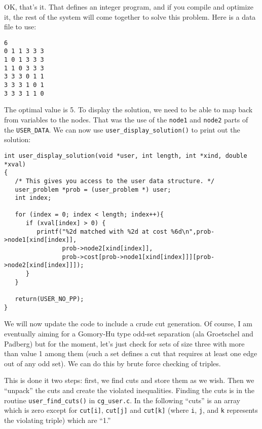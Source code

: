 \documentclass[11pt]{article}
\begin{document}
OK, that's it. That defines an integer program, and if you compile and
optimize it, the rest of the system will come together to solve this problem.
Here is a data file to use:
\begin{verbatim}
6
0 1 1 3 3 3
1 0 1 3 3 3
1 1 0 3 3 3
3 3 3 0 1 1
3 3 3 1 0 1
3 3 3 1 1 0
\end{verbatim}

The optimal value is 5. To display the solution, we need to be able to map
back from variables to the nodes. That was the use of the \texttt{node1} and
\texttt{node2} parts of the \texttt{USER\_DATA}. We can now use
\texttt{user\_display\_solution()} to print out the solution:

\begin{verbatim}
int user_display_solution(void *user, int length, int *xind, double *xval)
{
   /* This gives you access to the user data structure. */
   user_problem *prob = (user_problem *) user;
   int index;
 
   for (index = 0; index < length; index++){
      if (xval[index] > 0) {
         printf("%2d matched with %2d at cost %6d\n",prob->node1[xind[index]],
                prob->node2[xind[index]],
                prob->cost[prob->node1[xind[index]]][prob->node2[xind[index]]]);
      }	   
   }
   
   return(USER_NO_PP);
}
\end{verbatim}

We will now update the code to include a crude cut generation. Of course, I am
eventually aiming for a Gomory-Hu type odd-set separation (ala Groetschel and
Padberg) but for the moment, let's just check for sets of size three with more
than value 1 among them (such a set defines a cut that requires at least one
edge out of any odd set). We can do this by brute force checking of triples.

This is done it two steps: first, we find cuts and store them as we wish. Then
we ``unpack'' the cuts and create the violated inequalities. Finding the cuts
is in the routine \texttt{user\_find\_cuts()} in \texttt{cg\_user.c}. In the
following ``cuts'' is an array which is zero except for \texttt{cut[i]},
\texttt{cut[j]} and \texttt{cut[k]} (where \texttt{i}, \texttt{j}, and
\texttt{k} represents the violating triple) which are ``1.''
\end{document}
